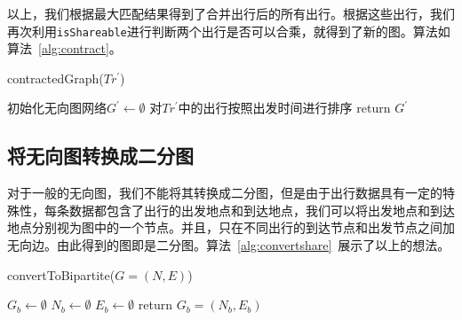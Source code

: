 \par
以上，我们根据最大匹配结果得到了合并出行后的所有出行。根据这些出行，我们再次利用\texttt{isShareable}进行判断两个出行是否可以合乘，就得到了新的图。算法如算法~\ref{alg:contract}。

\begin{algorithm}[htbp]
\SetAlgoLined
{}
\caption{contractedGraph($Tr^\prime$)}
\label{alg:contract}
\BlankLine
初始化无向图网络$G^\prime \leftarrow \emptyset$\;
对$Tr^\prime$中的出行按照出发时间进行排序\;
return $G^\prime$\;
\end{algorithm}



\subsection{将无向图转换成二分图}
对于一般的无向图，我们不能将其转换成二分图，但是由于出行数据具有一定的特殊性，每条数据都包含了出行的出发地点和到达地点，我们可以将出发地点和到达地点分别视为图中的一个节点。并且，只在不同出行的到达节点和出发节点之间加无向边。由此得到的图即是二分图。算法~\ref{alg:convertshare}~展示了以上的想法。

\begin{algorithm}[htbp]
\SetAlgoLined
{}
\caption{convertToBipartite($G = (N,E)$)}
\label{alg:convertshare}
\BlankLine
$G_b \leftarrow \emptyset$\;
$N_b \leftarrow \emptyset$\;
$E_b \leftarrow \emptyset$\;
return $G_b = (N_b, E_b)$\;
\end{algorithm}


